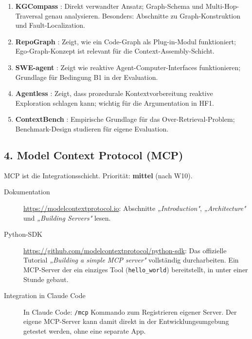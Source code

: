 \begin{enumerate}
  \item \textbf{KGCompass} \parencite{yang2025kgcompass}: Direkt verwandter Ansatz; Graph-Schema und Multi-Hop-Traversal genau analysieren. Besonders: Abschnitte zu Graph-Konstruktion und Fault-Localization.

  \item \textbf{RepoGraph} \parencite{ouyang2024repograph}: Zeigt, wie ein Code-Graph als Plug-in-Modul funktioniert; Ego-Graph-Konzept ist relevant für die Context-Assembly-Schicht.

  \item \textbf{SWE-agent} \parencite{yang2024sweagent}: Zeigt wie reaktive Agent-Computer-Interfaces funktionieren; Grundlage für Bedingung B1 in der Evaluation.

  \item \textbf{Agentless} \parencite{xia2024agentless}: Zeigt, dass prozedurale Kontextvorbereitung reaktive Exploration schlagen kann; wichtig für die Argumentation in HF1.

  \item \textbf{ContextBench} \parencite{li2026contextbench}: Empirische Grundlage für das Over-Retrieval-Problem; Benchmark-Design studieren für eigene Evaluation.
\end{enumerate}

\subsection*{4. Model Context Protocol (MCP)}

MCP ist die Integrationsschicht. Priorität: \textbf{mittel} (nach W10).

\begin{description}
  \item[Dokumentation] \url{https://modelcontextprotocol.io}: Abschnitte \emph{„Introduction"}, \emph{„Architecture"} und \emph{„Building Servers"} lesen.

  \item[Python-SDK] \url{https://github.com/modelcontextprotocol/python-sdk}: Das offizielle Tutorial \emph{„Building a simple MCP server"} vollständig durcharbeiten. Ein MCP-Server der ein einziges Tool (\texttt{hello\_world}) bereitstellt, in unter einer Stunde gebaut.

  \item[Integration in Claude Code] In Claude Code: \texttt{/mcp} Kommando zum Registrieren eigener Server. Der eigene MCP-Server kann damit direkt in der Entwicklungsumgebung getestet werden, ohne eine separate App.
\end{description}

